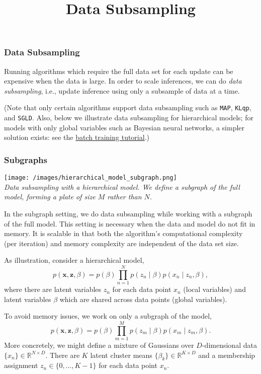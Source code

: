 \title{Data Subsampling}

\subsubsection{Data Subsampling}

Running algorithms which require the full data set for each update
can be expensive when the data is large. In order to scale inferences,
we can do \emph{data subsampling}, i.e., update inference using
only a subsample of data at a time.

(Note that only certain algorithms support data subsampling such as
\texttt{MAP}, \texttt{KLqp}, and \texttt{SGLD}. Also, below we
illustrate data subsampling for hierarchical models; for models with
only global variables such as Bayesian neural networks, a simpler
solution exists: see the
\href{/tutorials/batch-training}{batch training tutorial}.)

\subsubsection{Subgraphs}

\texttt{[image: /images/hierarchical\_model\_subgraph.png]} \\
{\small\textit{Data subsampling with a hierarchical model. We define
a subgraph of the full model, forming a plate of size $M$ rather than
$N$.}}

In the subgraph setting, we do data subsampling while working with a
subgraph of the full model. This setting is necessary when the data
and model do not fit in memory.
It is scalable in that both the
algorithm's computational complexity (per iteration) and memory
complexity are independent of the data set size.

As illustration, consider a hierarchical model,
\begin{equation*}
p(\mathbf{x}, \mathbf{z}, \beta)
= p(\beta) \prod_{n=1}^N p(z_n \mid \beta) p(x_n \mid z_n, \beta),
\end{equation*}
where there are latent variables $z_n$ for
each data point $x_n$ (local variables) and latent variables $\beta$
which are shared across data points (global variables).

To avoid memory issues, we work on only a subgraph of the model,
\begin{equation*}
p(\mathbf{x}, \mathbf{z}, \beta)
= p(\beta) \prod_{m=1}^M p(z_m \mid \beta) p(x_m \mid z_m, \beta).
\end{equation*}
More concretely, we might define a mixture of Gaussians over
$D$-dimensional data $\{x_n\}\in\mathbb{R}^{N\times D}$. There are $K$
latent cluster means $\{\beta_k\}\in\mathbb{R}^{K\times D}$ and a
membership assignment $z_n\in\{0,\ldots,K-1\}$ for each data point
$x_n$.

